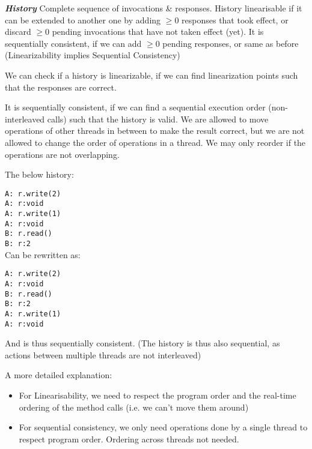 \documentclass{article}
\begin{document}
\textbf{\textit{History}} Complete sequence of invocations \& responses.
History linearisable if it can be extended to another one by adding $\geq 0$ responses that took effect, or discard $\geq 0$ pending invocations that have not taken effect (yet).
It is sequentially consistent, if we can add $\geq 0$ pending responses, or same as before (Linearizability implies Sequential Consistency)

We can check if a history is linearizable, if we can find linearization points such that the responses are correct.

It is sequentially consistent, if we can find a sequential execution order (non-interleaved calls) such that the history is valid.
We are allowed to move operations of other threads in between to make the result correct, but we are not allowed to change the order of operations in a thread. 
We may only reorder if the operations are not overlapping.
\begin{multicols}{2}
    The below history:

    \verb|A: r.write(2)|\\
    \verb|A: r:void|\\
    \verb|A: r.write(1)|\\
    \verb|A: r:void|\\
    \verb|B: r.read()|\\
    \verb|B: r:2|\\

    Can be rewritten as:

    \verb|A: r.write(2)|\\
    \verb|A: r:void|\\
    \verb|B: r.read()|\\
    \verb|B: r:2|\\
    \verb|A: r.write(1)|\\
    \verb|A: r:void|\\
\end{multicols}
And is thus sequentially consistent. (The history is thus also sequential, as actions between multiple threads are not interleaved)

A more detailed explanation:
\begin{itemize}
    \item For Linearisability, we need to respect the program order and the real-time ordering of the method calls (i.e. we can't move them around)
    \item For sequential consistency, we only need operations done by a single thread to respect program order. Ordering across threads not needed.
\end{itemize}
\end{document}
